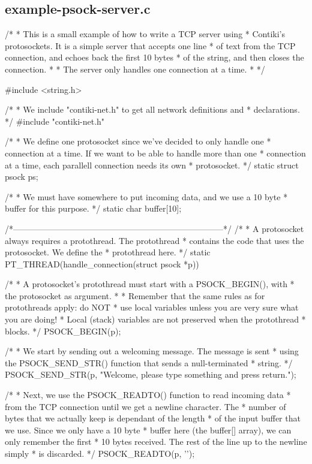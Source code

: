 \hypertarget{a00005}{\subsection{example-\/psock-\/server.\-c}
}

\begin{DoxyCodeInclude}
/*
 * This is a small example of how to write a TCP server using
 * Contiki's protosockets. It is a simple server that accepts one line
 * of text from the TCP connection, and echoes back the first 10 bytes
 * of the string, and then closes the connection.
 *
 * The server only handles one connection at a time.
 *
 */

#include <string.h>

/*
 * We include "contiki-net.h" to get all network definitions and
 * declarations.
 */
#include "contiki-net.h"

/*
 * We define one protosocket since we've decided to only handle one
 * connection at a time. If we want to be able to handle more than one
 * connection at a time, each parallell connection needs its own
 * protosocket.
 */
static struct psock ps;

/*
 * We must have somewhere to put incoming data, and we use a 10 byte
 * buffer for this purpose.
 */
static char buffer[10];

/*---------------------------------------------------------------------------*/
/*
 * A protosocket always requires a protothread. The protothread
 * contains the code that uses the protosocket. We define the
 * protothread here.
 */
static
PT_THREAD(handle_connection(struct psock *p))
{
  /*
   * A protosocket's protothread must start with a PSOCK_BEGIN(), with
   * the protosocket as argument.
   *
   * Remember that the same rules as for protothreads apply: do NOT
   * use local variables unless you are very sure what you are doing!
   * Local (stack) variables are not preserved when the protothread
   * blocks.
   */
  PSOCK_BEGIN(p);

  /*
   * We start by sending out a welcoming message. The message is sent
   * using the PSOCK_SEND_STR() function that sends a null-terminated
   * string.
   */
  PSOCK_SEND_STR(p, "Welcome, please type something and press return.\n");
  
  /*
   * Next, we use the PSOCK_READTO() function to read incoming data
   * from the TCP connection until we get a newline character. The
   * number of bytes that we actually keep is dependant of the length
   * of the input buffer that we use. Since we only have a 10 byte
   * buffer here (the buffer[] array), we can only remember the first
   * 10 bytes received. The rest of the line up to the newline simply
   * is discarded.
   */
  PSOCK_READTO(p, '\n');
  
}
\end{DoxyCodeInclude}

